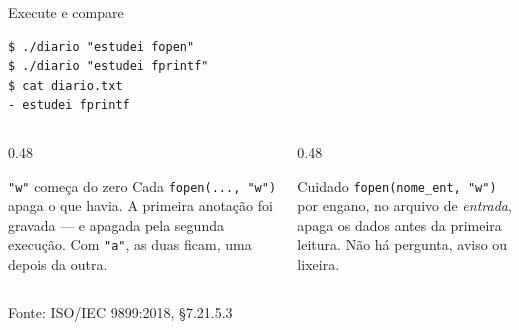 \documentclass[aspectratio=169]{beamer}
\newcommand{\fonte}[1]{\vfill\hfill{\scriptsize\textcolor{UFSGray}{Fonte: #1}}}
\begin{document}
\begin{frame}[fragile]{Execute e compare}
\begin{lstlisting}[style=shellStyle]
$ ./diario "estudei fopen"
$ ./diario "estudei fprintf"
$ cat diario.txt
- estudei fprintf
\end{lstlisting}
  \begin{columns}[T]
    \begin{column}{0.48\textwidth}
      \begin{block}{\texttt{"w"} começa do zero}
        \small Cada \texttt{fopen(..., "w")} apaga o que havia. A primeira
        anotação foi gravada --- e apagada pela segunda execução.
        Com \texttt{"a"}, as duas ficam, uma depois da outra.
      \end{block}
    \end{column}
    \begin{column}{0.48\textwidth}
      \begin{alertblock}{Cuidado}
        \small \texttt{fopen(nome\_ent, "w")} por engano, no arquivo de
        \emph{entrada}, apaga os dados antes da primeira leitura. Não há
        pergunta, aviso ou lixeira.
      \end{alertblock}
    \end{column}
  \end{columns}
  \fonte{ISO/IEC 9899:2018, §7.21.5.3~\cite{iso2018c17}}
\end{frame}
\end{document}
